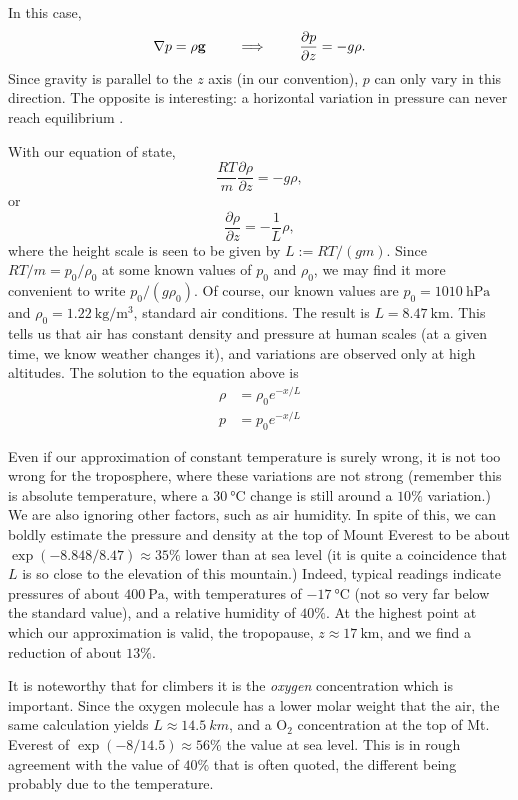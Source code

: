 In this case,
\[
\nabla p = \rho \mathbf{g} \qquad\implies\qquad
\frac{\partial p}{\partial z} = -g \rho .
\]
Since gravity is parallel to the $z$ axis (in our convention), $p$ can
only vary in this direction. The opposite is interesting: a horizontal
variation in pressure can never reach equilibrium
\cite{landau2013fluid}.

With our equation of state,
\[
\frac{ R T}{m} \frac{\partial \rho}{\partial z} = -g \rho ,
\]
or
\[
\frac{\partial \rho}{\partial z} = -\frac{1}{L} \rho ,
\]
where the height scale is seen to be given by $L:=RT/(gm)$. Since
$RT/m= p_0/\rho_0$ at some known values of $p_0$ and $\rho_0$, we may
find it more convenient to write $p_0/(g \rho_0)$. Of course, our
known values are $p_0=\SI{1010}{\hecto\pascal}$ and
$\rho_0=\SI{1.22}{\kilo\gram\per\meter\cubed}$, standard air
conditions. The result is $L=\SI{8.47}{\kilo\meter}$. This tells us
that air has constant density and pressure at human scales (at a given
time, we know weather changes it), and variations are observed only at
high altitudes. The solution to the equation above is
\begin{align*}
  \rho &= \rho_0 e^{-x/L} \\
  p &= p_0 e^{-x/L}
\end{align*}

Even if our approximation of constant temperature is surely wrong, it
is not too wrong for the troposphere, where these variations are not
strong (remember this is absolute temperature, where a
$\SI{30}{\celsius}$ change is still around a $10\%$ variation.) We are
also ignoring other factors, such as air humidity.  In spite of this,
we can boldly estimate the pressure and density at the top of Mount
Everest to be about $\exp( - 8.848 / 8.47 ) \approx 35 \%$ lower than
at sea level (it is quite a coincidence that $L$ is so close to the
elevation of this mountain.) Indeed, typical readings indicate
pressures of about $\SI{400}{\pascal}$, with temperatures of
$\SI{-17}{\celsius}$ (not so very far below the standard value), and a
relative humidity of $40\%$. At the highest point at which our
approximation is valid, the tropopause,
$z\approx\SI{17}{\kilo\meter}$, and we find a reduction of about
$13\%$.

It is noteworthy that for climbers it is the \emph{oxygen} concentration
which is important. Since the oxygen molecule has a lower molar weight that
the air, the same calculation yields $L\approx\SI{14.5}{km}$, and a
O$_2$ concentration at the top of Mt. Everest of $\exp(-8/14.5) \approx 56 \% $
the value at sea level. This is in rough agreement with the value of $40\%$ that
is often quoted, the different being probably due to the temperature.

